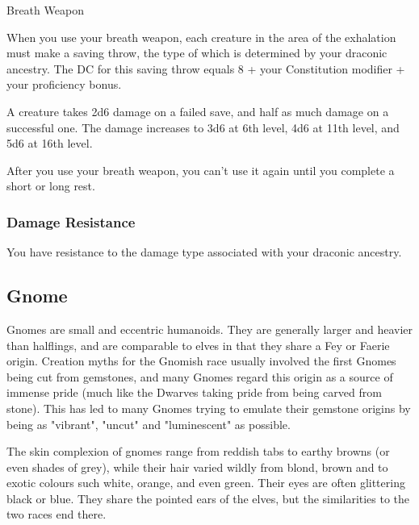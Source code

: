 \documentclass[10pt,twoside]{article}
\begin{document}
\begin{multicols}{2}
\begin{spellbox}{Breath Weapon}
    \spelldetails[%
    level   = 0,
    school  = Power,
    time    = 1 action,
    range   = \textit{See Draconic Ancestry},
    duration = Instant,
    components = {None},
    ]

    \begin{spellaction}[Effect]
    When you use your breath weapon, each creature in the area of the exhalation must make a saving throw, the type of which is determined by your draconic ancestry. The DC for this saving throw equals 8 + your Constitution modifier + your proficiency bonus.

    A creature takes 2d6 damage on a failed save, and half as much damage on a successful one. The damage increases to 3d6 at 6th level, 4d6 at 11th level, and 5d6 at 16th level.

    After you use your breath weapon, you can't use it again until you complete a short or long rest.
    \end{spellaction}
\end{spellbox}

\subsubsection*{Damage Resistance}
You have resistance to the damage type associated with your draconic ancestry.

\end{multicols}

\newpage


\subsection{Gnome}

Gnomes are small and eccentric humanoids. They are generally larger and heavier than halflings, and are comparable to elves in that they share a Fey or Faerie origin. Creation myths for the Gnomish race usually involved the first Gnomes being cut from gemstones, and many Gnomes regard this origin as a source of immense pride (much like the Dwarves taking pride from being carved from stone). This has led to many Gnomes trying to emulate their gemstone origins by being as "vibrant", "uncut" and "luminescent" as possible.

The skin complexion of gnomes range from reddish tabs to earthy browns (or even shades of grey), while their hair varied wildly from blond, brown and to exotic colours such white, orange, and even green. Their eyes are often glittering black or blue. They share the pointed ears of the elves, but the similarities to the two races end there.
\end{document}
